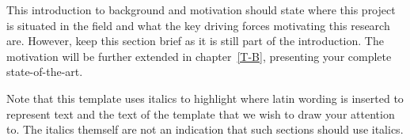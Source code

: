   This introduction to background and motivation should state where this project is situated in the field and what the key driving forces motivating this research are. However, keep this section brief as it is still part of the introduction. The motivation will be further extended in chapter~\ref{T-B}, presenting your complete state-of-the-art.

  Note that this template uses italics to highlight where latin wording is inserted to represent text and the text of the template that we wish to draw your attention to. The italics themself are not an indication that such sections should use italics.
\fi
